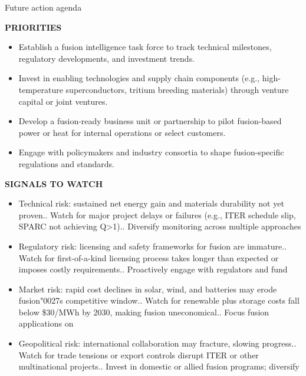 \documentclass[10pt,a4paper]{article}
\newcommand{\BOApos}{{\BOQuoteFont\char"0027}}
\begin{document}
\clearpage
{\sffamily\fontsize{21}{26}\selectfont\color{BONavy} Future action agenda}\par\vspace{7pt}
\begin{minipage}[t]{0.47\linewidth}
{\textcolor{BOGreen}{\scriptsize\bfseries PRIORITIES}}\par\vspace{3pt}
{\small\begin{itemize}
\item Establish a fusion intelligence task force to track technical milestones, regulatory developments, and investment trends.
\item Invest in enabling technologies and supply chain components (e.g., high-temperature superconductors, tritium breeding materials) through venture capital or joint ventures.
\item Develop a fusion-ready business unit or partnership to pilot fusion-based power or heat for internal operations or select customers.
\item Engage with policymakers and industry consortia to shape fusion-specific regulations and standards.
\end{itemize}}
\end{minipage}\hfill\begin{minipage}[t]{0.45\linewidth}
{\textcolor{BOGreen}{\scriptsize\bfseries SIGNALS TO WATCH}}\par\vspace{3pt}
{\small\begin{itemize}
\item Technical risk: sustained net energy gain and materials durability not yet proven.. Watch for major project delays or failures (e.g., ITER schedule slip, SPARC not achieving Q>1).. Diversify monitoring across multiple approaches
\item Regulatory risk: licensing and safety frameworks for fusion are immature.. Watch for first-of-a-kind licensing process takes longer than expected or imposes costly requirements.. Proactively engage with regulators and fund
\item Market risk: rapid cost declines in solar, wind, and batteries may erode fusion\BOApos{}s competitive window.. Watch for renewable plus storage costs fall below \$30/MWh by 2030, making fusion uneconomical.. Focus fusion applications on
\item Geopolitical risk: international collaboration may fracture, slowing progress.. Watch for trade tensions or export controls disrupt ITER or other multinational projects.. Invest in domestic or allied fusion programs; diversify
\end{itemize}}
\end{minipage}
\end{document}
